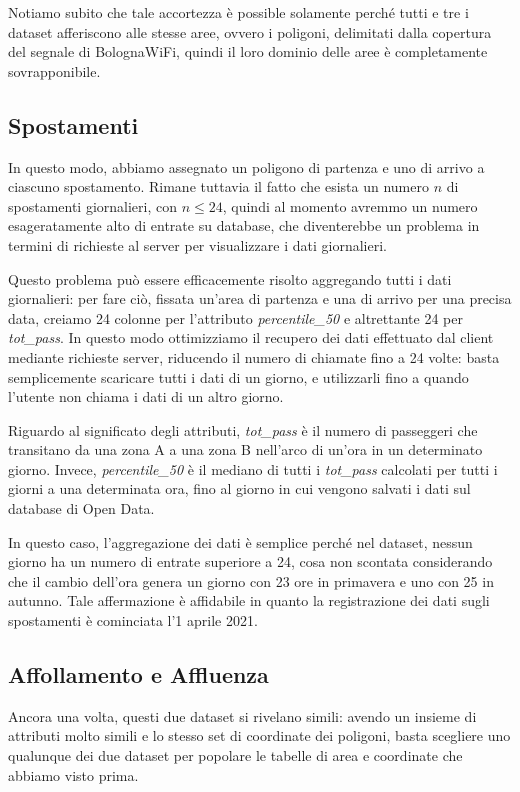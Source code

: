 Notiamo subito che tale accortezza è possible solamente perché tutti e tre i dataset afferiscono alle stesse aree, ovvero i poligoni, delimitati dalla copertura del segnale di BolognaWiFi, quindi il loro dominio delle aree è completamente sovrapponibile.

\subsection{Spostamenti}
In questo modo, abbiamo assegnato un poligono di partenza e uno di arrivo a ciascuno spostamento. Rimane tuttavia il fatto che esista un numero \( n \) di spostamenti giornalieri, con \( n \leq 24 \), quindi al momento avremmo un numero esageratamente alto di entrate su database, che diventerebbe un problema in termini di richieste al server per visualizzare i dati giornalieri.

Questo problema può essere efficacemente risolto aggregando tutti i dati giornalieri: per fare ciò, fissata un'area di partenza e una di arrivo per una precisa data, creiamo 24 colonne per l'attributo \textit{percentile\_50} e altrettante 24 per \textit{tot\_pass}. In questo modo ottimizziamo il recupero dei dati effettuato dal client mediante richieste server, riducendo il numero di chiamate fino a 24 volte: basta semplicemente scaricare tutti i dati di un giorno, e utilizzarli fino a quando l'utente non chiama i dati di un altro giorno.

Riguardo al significato degli attributi, \textit{tot\_pass} è il numero di passeggeri che transitano da una zona A a una zona B nell'arco di un'ora in un determinato giorno. Invece, \textit{percentile\_50} è il mediano di tutti i \textit{tot\_pass} calcolati per tutti i giorni a una determinata ora, fino al giorno in cui vengono salvati i dati sul database di Open Data.

In questo caso, l'aggregazione dei dati è semplice perché nel dataset, nessun giorno ha un numero di entrate superiore a 24, cosa non scontata considerando che il cambio dell'ora genera un giorno con 23 ore in primavera e uno con 25 in autunno. Tale affermazione è affidabile in quanto la registrazione dei dati sugli spostamenti è cominciata l'1 aprile 2021.

\subsection{Affollamento e Affluenza}
Ancora una volta, questi due dataset si rivelano simili: avendo un insieme di attributi molto simili e lo stesso set di coordinate dei poligoni, basta scegliere uno qualunque dei due dataset per popolare le tabelle di area e coordinate che abbiamo visto prima.

